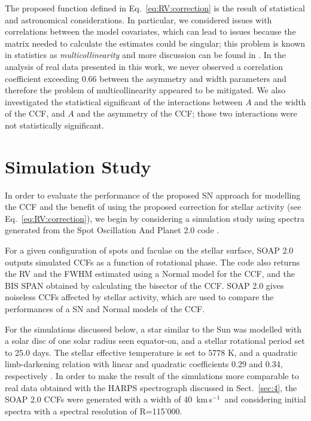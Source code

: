 \documentclass{aa}
\def\kms{\hbox{\,km\,s$^{-1}$}}       %
\begin{document}
The proposed function defined in Eq.~\eqref{eq:RV:correction} is the result of statistical and astronomical considerations. 
In particular, we considered issues with correlations between the model covariates, which can lead to issues because the matrix needed to calculate the estimates could be singular; this problem is known in statistics as \emph{multicollinearity} and more discussion can be found in \citet{belsley1991}.
In the analysis of real data presented in this work, we never observed a correlation coefficient exceeding $0.66$ between the asymmetry and width parameters and therefore the problem of multicollinearity appeared to be mitigated. 
We also investigated the statistical significant of the interactions between $A$ and the width of the CCF, and $A$ and the asymmetry of the CCF; those two interactions were not statistically significant.

\section{Simulation Study} \label{sec:soap}
In order to evaluate the performance of the proposed SN approach for modelling the CCF and the benefit of using the proposed correction for stellar activity (see Eq.~\eqref{eq:RV:correction}), we begin by considering a simulation study using spectra generated from the Spot Oscillation And Planet 2.0 code \citep[SOAP 2.0,][]{Dumusque-2014b}.

For a given configuration of spots and faculae on the stellar surface, SOAP 2.0 outputs simulated CCFs as a function of rotational phase. The code also returns the RV and the FWHM estimated using a Normal model for the CCF, and the BIS SPAN obtained by calculating the bisector of the CCF. 
SOAP 2.0 gives noiseless CCFs affected by stellar activity, which are used to compare the performances of a SN and Normal models of the CCF.

For the simulations discussed below, a star similar to the Sun was modelled with a solar disc of one solar radius seen equator-on, and a stellar rotational period set to 25.0 days.
The stellar effective temperature is set to 5778 K, and a quadratic limb-darkening relation with linear and quadratic coefficients 0.29 and 0.34, respectively \citep[][]{Oshagh-2013a, Claret-2011}.
In order to make the result of the simulations more comparable to real data obtained with the HARPS spectrograph discussed in Sect.~\ref{sec:4}, the SOAP 2.0 CCFs were generated with a width of 40 \kms\, and considering initial spectra with a spectral resolution of R=115'000.
\end{document}

